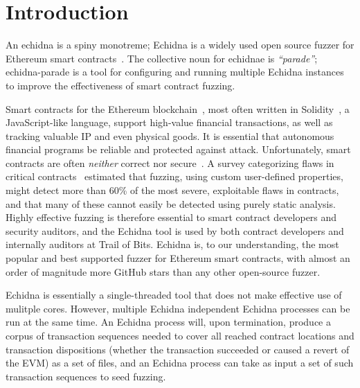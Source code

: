 \documentclass[sigconf]{acmart}
\begin{document}



\maketitle

\section{Introduction}

An echidna is a spiny monotreme; Echidna is a widely used open source fuzzer for
Ethereum smart contracts~\cite{echidnaissta,echidna-code}.  The collective noun for
echidnae is \emph{``parade''}; echidna-parade is a tool for configuring and
running multiple Echidna instances to improve the
effectiveness of smart contract fuzzing.

Smart contracts for the Ethereum blockchain~\cite{buterin2013whitepaper}, most often written in Solidity~\cite{wood2014yellow}, a
JavaScript-like language, support high-value financial transactions,
as well as tracking valuable IP and even physical goods.  It is essential that
autonomous financial programs be reliable and protected against
attack.  Unfortunately, smart contracts are often \emph{neither}
correct nor secure~\cite{SurveyAttacks}.  A survey categorizing flaws
in critical contracts~\cite{FC20} estimated that fuzzing, using custom
user-defined properties, might detect more than 60\% of the most
severe, exploitable flaws in contracts, and that many of these cannot easily
be detected using purely static analysis.  Highly effective fuzzing is
therefore essential to smart contract developers and security
auditors, and the Echidna tool is used by both contract developers
and internally auditors at Trail of Bits.  Echidna is, to our understanding, the most popular and best supported fuzzer for Ethereum smart contracts, with almost an order of magnitude more GitHub stars than any other open-source fuzzer.

Echidna is essentially a single-threaded tool that does not make
effective use of mulitple cores.  However, multiple Echidna
independent Echidna processes can be run at the same time.  An Echidna
process will, upon termination, produce a corpus of transaction
sequences needed to cover all reached contract locations and
transaction dispositions (whether the transaction succeeded or caused
a revert of the EVM) as a set of files, and an Echidna process can
take as input a set of such transaction sequences to seed fuzzing.
\end{document}
